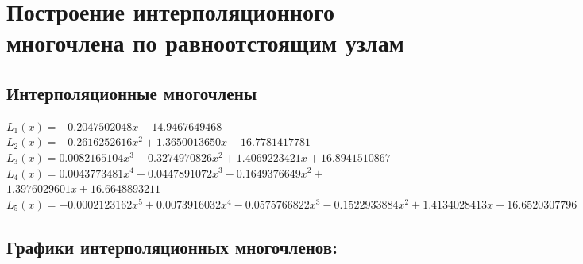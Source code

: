 \documentclass{article}
\begin{document}
	\section{Построение интерполяционного многочлена по равноотстоящим узлам}
	
	\subsection{Интерполяционные многочлены}
	\begin{flushleft}
		$ L_1(x)=-0.2047502048 x+14.9467649468 $\\
		$ L_2(x)=-0.2616252616 x^2+1.3650013650 x+16.7781417781 $\\
		$L_3(x)=0.0082165104x^3-0.3274970826x^2+1.4069223421x+ 16.8941510867$\\
		$L_4(x)= 0.0043773481x^4-0.0447891072x^3-0.1649376649x^2  +$\\
		$1.3976029601x+16.6648893211$\\
		$L_5(x)=-0.0002123162x^5+0.0073916032x^4-0.0575766822x^3 -0.1522933884x^2+1.4134028413x+16.6520307796$
	\end{flushleft}

	\newpage
	
	\subsection{Графики интерполяционных многочленов:}
	
\end{document}
